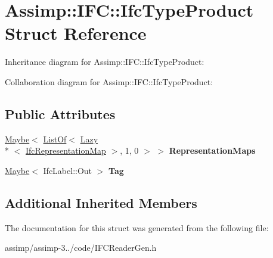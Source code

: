 \hypertarget{struct_assimp_1_1_i_f_c_1_1_ifc_type_product}{\section{Assimp\+:\+:I\+F\+C\+:\+:Ifc\+Type\+Product Struct Reference}
\label{struct_assimp_1_1_i_f_c_1_1_ifc_type_product}
}


Inheritance diagram for Assimp\+:\+:I\+F\+C\+:\+:Ifc\+Type\+Product\+:


Collaboration diagram for Assimp\+:\+:I\+F\+C\+:\+:Ifc\+Type\+Product\+:
\subsection*{Public Attributes}
\begin{DoxyCompactItemize}
\item 
\hypertarget{struct_assimp_1_1_i_f_c_1_1_ifc_type_product_ac12527475d1ca615def792b2f78a789d}{\hyperlink{struct_assimp_1_1_s_t_e_p_1_1_maybe}{Maybe}$<$ \hyperlink{struct_assimp_1_1_s_t_e_p_1_1_list_of}{List\+Of}$<$ \hyperlink{struct_assimp_1_1_s_t_e_p_1_1_lazy}{Lazy}\\*
$<$ \hyperlink{struct_assimp_1_1_i_f_c_1_1_ifc_representation_map}{Ifc\+Representation\+Map} $>$, 1, 0 $>$ $>$ {\bfseries Representation\+Maps}}\label{struct_assimp_1_1_i_f_c_1_1_ifc_type_product_ac12527475d1ca615def792b2f78a789d}

\item 
\hypertarget{struct_assimp_1_1_i_f_c_1_1_ifc_type_product_a332732510e0391cc86000fa835d645d8}{\hyperlink{struct_assimp_1_1_s_t_e_p_1_1_maybe}{Maybe}$<$ Ifc\+Label\+::\+Out $>$ {\bfseries Tag}}\label{struct_assimp_1_1_i_f_c_1_1_ifc_type_product_a332732510e0391cc86000fa835d645d8}

\end{DoxyCompactItemize}
\subsection*{Additional Inherited Members}


The documentation for this struct was generated from the following file\+:\begin{DoxyCompactItemize}
\item 
assimp/assimp-\/3../code/I\+F\+C\+Reader\+Gen.\+h\end{DoxyCompactItemize}
